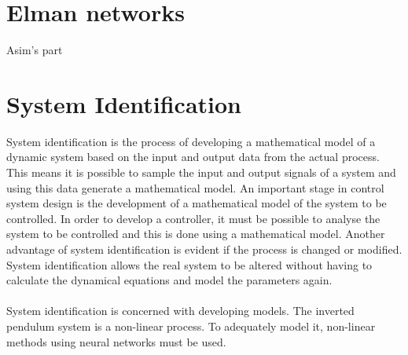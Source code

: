 \documentclass[12pt, onecolumn]{extarticle}
\begin{document}
\section{Elman networks} 
Asim's part
\section{System Identification} System identification is the process of developing a mathematical model of a dynamic system based on the input and output data from the actual process. This means it is possible to sample the input and output signals of a system and using this data generate a mathematical model. An important stage in control system design is the development of a mathematical model of the system to be controlled. In order to develop a controller, it must be possible to analyse the system to be controlled and this is done using a mathematical model. Another advantage of system identification is evident if the process is changed or modified. System identification allows the real system to be altered without having to calculate the dynamical equations and model the parameters again. \\ \\

System identification is concerned with developing models. The inverted pendulum system is a non-linear process. To adequately
model it, non-linear methods using neural networks must be used.
\end{document}

